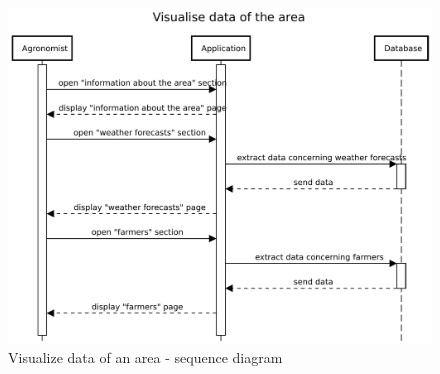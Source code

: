 \begin{figure}[H]
    \centering
    \includegraphics[scale=0.65]{Images/Sequence diagrams/Agronomist - visualise data of the area.pdf}

    \caption{Visualize data of an area - sequence diagram}
    \label{fig:fig:seq_diag_visualize_area}
\end{figure}



